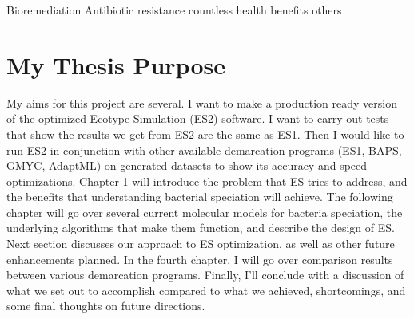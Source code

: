 Bioremediation
Antibiotic resistance
countless health benefits
others

\section{My Thesis Purpose}%

My aims for this project are several. I want to make a production ready version of the optimized Ecotype Simulation (ES2) software.
I want to carry out tests that show the results we get from ES2 are the same as ES1. 
Then I would like to run ES2 in conjunction with other available demarcation programs (ES1, BAPS, GMYC, AdaptML) on generated datasets to show its accuracy and speed optimizations.
Chapter 1 will introduce the problem that ES tries to address, and the benefits that understanding bacterial speciation will achieve.
The following chapter will go over several current molecular models for bacteria speciation, the underlying algorithms that make them function, and describe the design of ES.
Next section discusses our approach to ES optimization, as well as other future enhancements planned.
In the fourth chapter, I will go over comparison results between various demarcation programs.
Finally, I'll conclude with a discussion of what we set out to accomplish compared to what we achieved, shortcomings, and some final thoughts on future directions.

